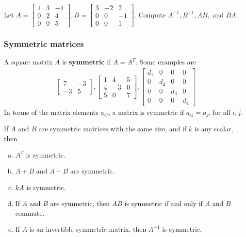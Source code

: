 \documentclass[12pt,letterpaper,reqno]{article}
\numberwithin{equation}{section}
\begin{document}
\begin{exercise}
Let $A=\begin{bmatrix}
		1 & 3 & -1 \\ 0 & 2 & 4 \\ 0 & 0 & 5
	\end{bmatrix}, B= \begin{bmatrix}
		3 & -2 & 2 \\ 0 & 0 & -1 \\ 0 & 0 & 1
	\end{bmatrix}$. Compute $A^{-1}, B^{-1}, AB,$ and $BA$.	
\end{exercise}

\subsubsection{Symmetric matrices}
A square matrix $A$ is {\bf symmetric} if $A=A^T$. Some examples are
\begin{align*}
	\begin{bmatrix}
		7 & -3 \\ -3 & 5
	\end{bmatrix}, \begin{bmatrix}
		1 & 4 & 5 \\ 4 & -3 & 0 \\ 5 & 0 & 7
	\end{bmatrix}, \begin{bmatrix}
		d_1 & 0 & 0 & 0 \\ 0 & d_2 & 0 & 0 \\ 0 & 0 & d_3 & 0 \\ 0 & 0 & 0 & d_4
	\end{bmatrix}
\end{align*}
In terms of the matrix elements $a_{ij}$, a matrix is symmetric if $a_{ij}=a_{ji}$ for all $i,j$.
 
\begin{thm}
		If $A$ and $B$ are symmetric matrices with the same size, and if $k$ is any scalar, then
\begin{enumerate}[(a)] 
	\item $A^T$ is symmetric.
	\item $A+B$ and $A-B$ are symmetric.
	\item $kA$ is symmetric.
	\item If $A$ and $B$ are symmetric, then $AB$ is symmetric if and only if $A$ and $B$ commute.
	\item If $A$ is an invertible symmetric matrix, then $A^{-1}$ is symmetric.
\end{enumerate}
\end{thm}
\end{document}
